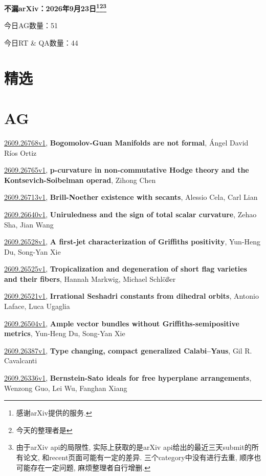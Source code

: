\documentclass[9pt, a4paper]{article}
\theoremstyle{plain}
\theoremstyle{definition}
\theoremstyle{remark}
\newcommand{\arxiv}[3]{\href{https://arxiv.org/abs/#1}{#1}, \textbf{\textcolor{arxivblue}{#2}}, #3}
\newcommand{\AGnumber}{51}
\newcommand{\RTQAnumber}{44}
\newcommand{\NewestDate}{2026年9月23日}
\newcommand{\todayarXiver}{} %
\begin{document}
\begin{center}
    \Huge\textbf{不漏arXiv：\NewestDate\footnote{感谢arXiv提供的服务.}\footnote{今天的整理者是\todayarXiver}\footnote{由于arXiv api的局限性, 实际上获取的是arXiv api给出的最近三天submit的所有论文, 和recent页面可能有一定的差异. 三个category中没有进行去重, 顺序也可能存在一定问题, 麻烦整理者自行增删.}} \\
\end{center}

\setcounter{section}{-1}

\begin{center}
    今日AG数量：\AGnumber
    
    今日RT \& QA数量：\RTQAnumber
    
\end{center}


\section{精选}


\section{AG}
\arxiv{2609.26768v1}{Bogomolov-Guan Manifolds are not formal}{Ángel David Ríos Ortiz}

\arxiv{2609.26765v1}{p-curvature in non-commutative Hodge theory and the Kontsevich-Soibelman operad}{Zihong Chen}

\arxiv{2609.26713v1}{Brill-Noether existence with secants}{Alessio Cela, Carl Lian}

\arxiv{2609.26640v1}{Uniruledness and the sign of total scalar curvature}{Zehao Sha, Jian Wang}

\arxiv{2609.26528v1}{A first-jet characterization of Griffiths positivity}{Yun-Heng Du, Song-Yan Xie}

\arxiv{2609.26525v1}{Tropicalization and degeneration of short flag varieties and their fibers}{Hannah Markwig, Michael Schlößer}

\arxiv{2609.26521v1}{Irrational Seshadri constants from dihedral orbits}{Antonio Laface, Luca Ugaglia}

\arxiv{2609.26504v1}{Ample vector bundles without Griffiths-semipositive metrics}{Yun-Heng Du, Song-Yan Xie}

\arxiv{2609.26387v1}{Type changing, compact generalized Calabi--Yaus}{Gil R. Cavalcanti}

\arxiv{2609.26336v1}{Bernstein-Sato ideals for free hyperplane arrangements}{Wenzong Guo, Lei Wu, Fanghan Xiang}
\end{document}
